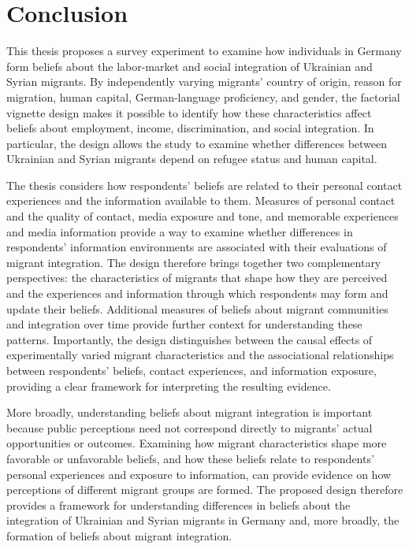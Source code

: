 \section{Conclusion}

This thesis proposes a survey experiment to examine how individuals in Germany form beliefs about the labor-market 
and social integration of Ukrainian and Syrian migrants. By independently varying migrants' country of origin, 
reason for migration, human capital, German-language proficiency, and gender, the factorial vignette design makes it 
possible to identify how these characteristics affect beliefs about employment, income, discrimination, and social 
integration. In particular, the design allows the study to examine whether differences between Ukrainian and Syrian 
migrants depend on refugee status and human capital.

The thesis considers how respondents' beliefs are related to their personal contact experiences and the information 
available to them. Measures of personal contact and the quality of contact, media exposure and tone, and memorable experiences and 
media information provide a way to examine whether differences in respondents' information environments are associated 
with their evaluations of migrant integration. The design therefore brings together two complementary perspectives: 
the characteristics of migrants that shape how they are perceived and the experiences and information through which 
respondents may form and update their beliefs. Additional measures of beliefs about migrant communities and integration 
over time provide further context for understanding these patterns. Importantly, the design distinguishes between the 
causal effects of experimentally varied migrant characteristics and the associational relationships between respondents' 
beliefs, contact experiences, and information exposure, providing a clear framework for interpreting the resulting evidence.

More broadly, understanding beliefs about migrant integration is important because public perceptions need not 
correspond directly to migrants' actual opportunities or outcomes. Examining how migrant characteristics shape more 
favorable or unfavorable beliefs, and how these beliefs relate to respondents' personal experiences and exposure to 
information, can provide evidence on how perceptions of different migrant groups are formed. The proposed design 
therefore provides a framework for understanding differences in beliefs about the integration of Ukrainian and Syrian 
migrants in Germany and, more broadly, the formation of beliefs about migrant integration.